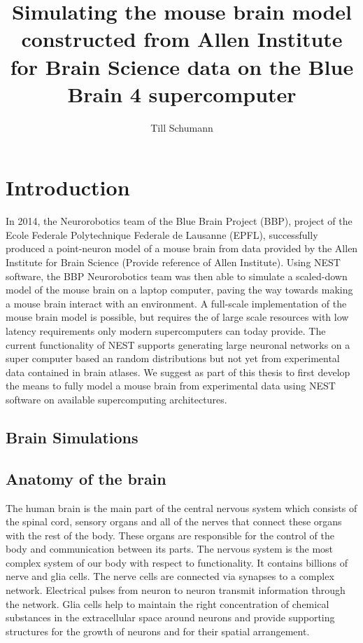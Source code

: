 \documentclass[a4paper]{article}
\title{ Simulating the mouse brain model constructed from Allen Institute for Brain Science data on the Blue Brain 4 supercomputer }
\author{Till Schumann}
\begin{document}
   \maketitle

\section{Introduction}
In 2014, the Neurorobotics team of the Blue Brain Project (BBP), project of the Ecole Federale Polytechnique Federale de Lausanne (EPFL), successfully produced a point-neuron model
of a mouse brain from data provided by the Allen Institute for Brain Science (Provide reference of Allen Institute).
Using NEST software, the BBP Neurorobotics team was then able to simulate a
scaled-down model of the mouse brain on a laptop computer, paving the way towards
making a mouse brain interact with an environment. A full-scale implementation of
the mouse brain model is possible, but requires the of large scale resources with low latency requirements only modern supercomputers can today provide.
The current functionality of NEST supports  generating large neuronal networks
on a super computer based an random distributions but not yet from experimental data contained in brain atlases. 
We suggest as part of this thesis to first develop the means to fully model a mouse brain from experimental data using NEST software on available supercomputing architectures.
\newpage

\subsection{Brain Simulations}
\subsection{Anatomy of the brain}
 
 The human brain is the main part of the central nervous system
 which consists of the spinal cord, sensory organs
 and all of the nerves that connect these organs with the rest of the body.
 These organs are responsible for the control of the body and communication between its parts.
 The nervous system is the most complex system of our body with respect to functionality.
 It contains billions of nerve and glia cells. 
 The nerve cells are connected via synapses to a complex network.
 Electrical pulses from neuron to neuron transmit information through the network.
 Glia cells help to maintain the right concentration of chemical substances in the
 extracellular space around neurons and provide supporting structures for the
 growth of neurons and for their spatial arrangement.
\end{document}
